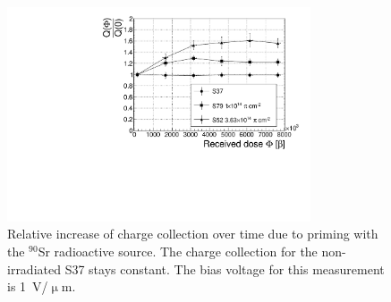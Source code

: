 \begin{figure}[!t]
\begin{center}
\includegraphics[width=0.8\textwidth]{03_measurement_results/plots/ccdpriming}
\caption{Relative increase of charge collection over time due to priming with the $^{90}$Sr radioactive source. The charge collection for the non-irradiated S37 stays constant. The bias voltage for this measurement is 1~V/$\upmu$m.}
\label{fig:ccincrease}
\end{center}
\end{figure}


